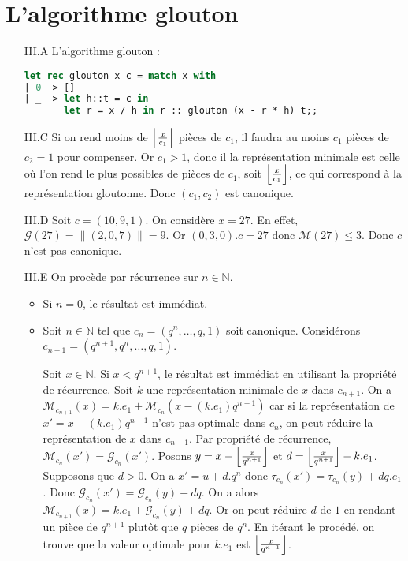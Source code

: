 \documentclass{article}
\newcommand{\N}{\mathbb{N}}
\newcommand{\M}{\mathscr{M}}
\newcommand{\T}{\tau}
\newcommand{\G}{\mathscr{G}}
\newcommand{\norm}[1]{\|#1\|}
\newcommand{\scal}{.}
\DeclarePairedDelimiter{\floor}{\lfloor}{\rfloor}
\begin{document}
\section{L'algorithme glouton}
\begin{enumerate}
    \item[III.A] L'algorithme glouton :
        \begin{lstlisting}[language=Caml]
let rec glouton x c = match x with
| 0 -> []
| _ -> let h::t = c in
       let r = x / h in r :: glouton (x - r * h) t;;
        \end{lstlisting}

    \item[III.C] Si on rend moins de $\floor*{\frac{x}{c_1}}$ pièces de $c_1$, il faudra au moins $c_1$ pièces de $c_2 = 1$ pour compenser. Or $c_1 > 1$, donc il la représentation minimale est celle où l'on rend le plus possibles de pièces de $c_1$, soit $\floor*{\frac{x}{c_1}}$, ce qui correspond à la représentation gloutonne. Donc $(c_1, c_2)$ est canonique.

    \item[III.D] Soit $c = (10, 9, 1)$. On considère $x = 27$. En effet, $\G(27) = \norm{(2, 0, 7)} = 9$. Or $(0, 3, 0)\scal c = 27$ donc $\M(27) \leq 3$. Donc $c$ n'est pas canonique.

    \item[III.E] On procède par récurrence sur $n\in\N$.
        \begin{itemize}
            \item Si $n=0$, le résultat est immédiat.
            \item Soit $n\in\N$ tel que $c_n = (q^n, \ldots, q, 1)$ soit canonique. Considérons $c_{n+1} = (q^{n+1}, q^n, \ldots, q, 1)$.

                Soit $x\in\N$. Si $x<q^{n+1}$, le résultat est immédiat en utilisant la propriété de récurrence. Soit $k$ une représentation minimale de $x$ dans $c_{n+1}$. On a $\M_{c_{n+1}}(x) = k\scal e_1 + \M_{c_n}(x - (k\scal e_1)q^{n+1})$ car si la représentation de $x' = x - (k\scal e_1)q^{n+1}$ n'est pas optimale dans $c_n$, on peut réduire la représentation de $x$ dans $c_{n+1}$. Par propriété de récurrence, $\M_{c_n}(x') = \G_{c_n}(x')$. Posons $y = x - \floor*{\frac{x}{q^{n+1}}}$ et $d =\floor*{\frac{x}{q^{n+1}}} - k\scal e_1$. Supposons que $d > 0$. On a $x' = u + d.q^n$ donc $\T_{c_n}(x') = \T_{c_n}(y) + dq.e_1$. Donc $\G_{c_n}(x') = \G_{c_n}(y) + dq$. On a alors $\M_{c_{n+1}}(x) = k\scal e_1 + \G_{c_n}(y) + dq$. Or on peut réduire $d$ de $1$ en rendant un pièce de $q^{n+1}$ plutôt que $q$ pièces de $q^n$. En itérant le procédé, on trouve que la valeur optimale pour $k\scal e_1$ est $\floor*{\frac{x}{q^{n+1}}}$.
        \end{itemize}


\end{enumerate}
\end{document}
